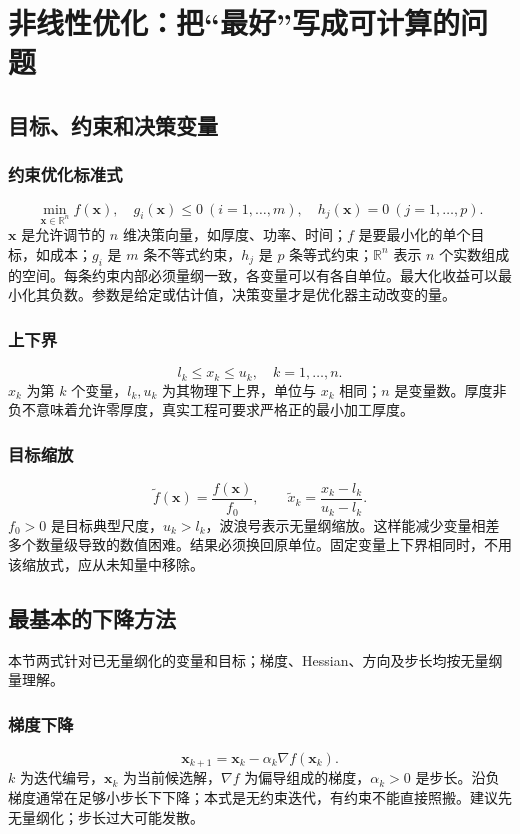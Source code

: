 \chapter{非线性优化：把“最好”写成可计算的问题}
\section{目标、约束和决策变量}
\subsection{约束优化标准式}
\begin{equation}\min_{\boldsymbol x\in\mathbb R^n}f(\boldsymbol x),\quad g_i(\boldsymbol x)\le0\ (i=1,\ldots,m),\quad h_j(\boldsymbol x)=0\ (j=1,\ldots,p).\end{equation}
$\boldsymbol x$ 是允许调节的 $n$ 维决策向量，如厚度、功率、时间；$f$ 是要最小化的单个目标，如成本；$g_i$ 是 $m$ 条不等式约束，$h_j$ 是 $p$ 条等式约束；$\mathbb R^n$ 表示 $n$ 个实数组成的空间。每条约束内部必须量纲一致，各变量可以有各自单位。最大化收益可以最小化其负数。参数是给定或估计值，决策变量才是优化器主动改变的量。
\subsection{上下界}
\begin{equation}l_k\le x_k\le u_k,\quad k=1,\ldots,n.\end{equation}
$x_k$ 为第 $k$ 个变量，$l_k,u_k$ 为其物理下上界，单位与 $x_k$ 相同；$n$ 是变量数。厚度非负不意味着允许零厚度，真实工程可要求严格正的最小加工厚度。
\subsection{目标缩放}
\begin{equation}\widetilde f(\boldsymbol x)=\frac{f(\boldsymbol x)}{f_0},\qquad \widetilde x_k=\frac{x_k-l_k}{u_k-l_k}.\end{equation}
$f_0>0$ 是目标典型尺度，$u_k>l_k$，波浪号表示无量纲缩放。这样能减少变量相差多个数量级导致的数值困难。结果必须换回原单位。固定变量上下界相同时，不用该缩放式，应从未知量中移除。

\section{最基本的下降方法}
本节两式针对已无量纲化的变量和目标；梯度、Hessian、方向及步长均按无量纲量理解。
\subsection{梯度下降}
\begin{equation}\boldsymbol x_{k+1}=\boldsymbol x_k-\alpha_k\nabla f(\boldsymbol x_k).\end{equation}
$k$ 为迭代编号，$\boldsymbol x_k$ 为当前候选解，$\nabla f$ 为偏导组成的梯度，$\alpha_k>0$ 是步长。沿负梯度通常在足够小步长下下降；本式是无约束迭代，有约束不能直接照搬。建议先无量纲化；步长过大可能发散。
